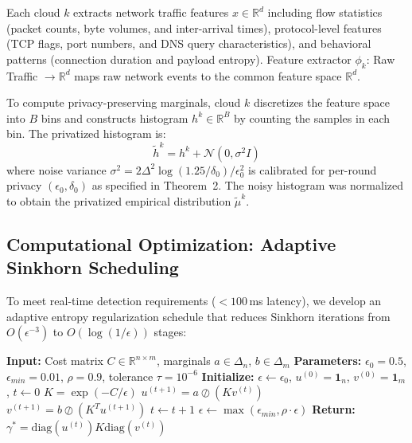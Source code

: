 \documentclass{ieeeaccess}
\theoremstyle{plain}
\theoremstyle{definition}
\theoremstyle{remark}
\begin{document}
Each cloud $k$ extracts network traffic features $x \in \mathbb{R}^d$ including flow statistics (packet counts, byte volumes, and inter-arrival times), protocol-level features (TCP flags, port numbers, and DNS query characteristics), and behavioral patterns (connection duration and payload entropy). Feature extractor $\phi_k$: Raw Traffic $\to \mathbb{R}^d$ maps raw network events to the common feature space $\mathbb{R}^d$.

To compute privacy-preserving marginals, cloud $k$ discretizes the feature space into $B$ bins and constructs histogram $h^k \in \mathbb{R}^B$ by counting the samples in each bin. The privatized histogram is:
\begin{equation}
\tilde{h}^k = h^k + \mathcal{N}(0, \sigma^2 I)
\end{equation}
where noise variance $\sigma^2 = 2\Delta^2 \log(1.25/\delta_0)/\epsilon_0^2$ is calibrated for per-round privacy $(\epsilon_0, \delta_0)$ as specified in Theorem~2. The noisy histogram was normalized to obtain the privatized empirical distribution $\tilde{\mu}^k$.

\subsection{Computational Optimization: Adaptive Sinkhorn Scheduling}

To meet real-time detection requirements ($< 100$\,ms latency), we develop an adaptive entropy regularization schedule that reduces Sinkhorn iterations from $O(\epsilon^{-3})$ to $O(\log(1/\epsilon))$ stages:

\begin{algorithm}[t]
\caption{Adaptive Sinkhorn with Regularization Scheduling}
\label{alg:sinkhorn}
\begin{algorithmic}[1]
\STATE \textbf{Input:} Cost matrix $C \in \mathbb{R}^{n \times m}$, marginals $a \in \Delta_n$, $b \in \Delta_m$
\STATE \textbf{Parameters:} $\epsilon_0 = 0.5$, $\epsilon_{min} = 0.01$, $\rho = 0.9$, tolerance $\tau = 10^{-6}$
\STATE \textbf{Initialize:} $\epsilon \gets \epsilon_0$, $u^{(0)} = \mathbf{1}_n$, $v^{(0)} = \mathbf{1}_m$, $t \gets 0$
    \STATE $K = \exp(-C/\epsilon)$ 
        \STATE $u^{(t+1)} = a \oslash (Kv^{(t)})$ 
        \STATE $v^{(t+1)} = b \oslash (K^T u^{(t+1)})$
        \STATE $t \gets t + 1$
    \ENDWHILE
    \STATE $\epsilon \gets \max(\epsilon_{min}, \rho \cdot \epsilon)$ 
\ENDWHILE
\STATE \textbf{Return:} $\gamma^* = \text{diag}(u^{(t)})K\text{diag}(v^{(t)})$
\end{algorithmic}
\end{algorithm}
\end{document}
